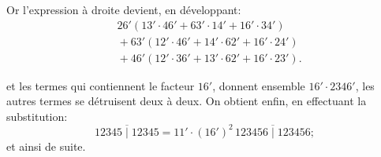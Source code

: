 \documentclass[11pt,a4paper]{article}
\begin{document}
\medskip

Or l'expression \`a droite devient, en d\'eveloppant:
\begin{align*}
& 26'(13'\cdot 46' + 63'\cdot 14' + 16'\cdot 34')\\
&{}+ 63'(12'\cdot 46' + 14'\cdot 62' + 16'\cdot 24')\\
&{}+ 46'(12'\cdot 36' + 13'\cdot 62' + 16'\cdot 23').
\end{align*}

\medskip

et les termes qui contiennent le facteur $16'$, donnent ensemble $16'\cdot 2346'$, les autres termes se d\'etruisent deux \`a deux. On obtient enfin, en effectuant la substitution:
\[
\overline{12345 \mid 12345} = 11'\cdot(16')^2\,\overline{123456 \mid 123456};
\]
et ainsi de suite.

\medskip
\end{document}
